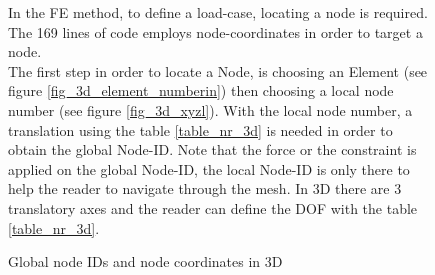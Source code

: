 \begin{figure}[!htb]
\begin{minipage}[!h]{0.65 \textwidth}
  \def\svgwidth{\textwidth}
 
 \caption{Global node IDs and node coordinates in 3D} 
 \label{fig_3d_node_numberin} 
 \vspace{1cm}
\end{minipage}
\hfill
\begin{minipage}{0.3 \textwidth}
In the FE method, to define a load-case, locating
a node is required. The 169 lines of code \cite{Liu.2014} employs node-coordinates in order to target a node. \\
The first step in order to locate a Node, is choosing an Element (see figure \ref{fig_3d_element_numberin}) then choosing a local node 
number (see figure \ref{fig_3d_xyzl}). With the local 
node number, a translation using
the table \ref{table_nr_3d} is needed in order to obtain the
 global Node-ID. Note that the force or the constraint is applied on 
 the global Node-ID, the local Node-ID is only there to help the reader to navigate
  through the mesh. In 3D there are 3 translatory
   axes and the reader can define
  the DOF with the table \ref{table_nr_3d}.\\   
  \end{minipage}   
     \end{figure} 
